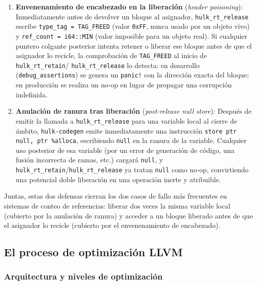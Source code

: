 \documentclass[12pt, a4paper]{article}
\begin{document}
\begin{enumerate}[leftmargin=*, label=\arabic*.]
  \item \textbf{Envenenamiento de encabezado en la liberación} (\textit{header
        poisoning}): Inmediatamente antes de devolver un bloque al asignador,
        \texttt{hulk\_rt\_release} escribe \texttt{type\_tag = TAG\_FREED}
        (valor \texttt{0xFF}, nunca usado por un objeto vivo) y
        \texttt{ref\_count = i64::MIN} (valor imposible para un objeto real). Si
        cualquier puntero colgante posterior intenta retener o liberar ese bloque
        antes de que el asignador lo recicle, la comprobación de
        \texttt{TAG\_FREED} al inicio de \texttt{hulk\_rt\_retain}/
        \texttt{hulk\_rt\_release} lo detecta: en desarrollo (\texttt{debug\_assertions})
        se genera un \texttt{panic!} con la dirección exacta del bloque; en producción
        se realiza un no-op en lugar de propagar una corrupción indefinida.
  \item \textbf{Anulación de ranura tras liberación} (\textit{post-release null
        store}): Después de emitir la llamada a \texttt{hulk\_rt\_release} para
        una variable local al cierre de ámbito, \texttt{hulk-codegen} emite
        inmediatamente una instrucción \texttt{store ptr null, ptr \%alloca},
        escribiendo \texttt{null} en la ranura de la variable. Cualquier uso
        posterior de esa variable (por un error de generación de código, una
        fusión incorrecta de ramas, etc.) cargará \texttt{null}, y
        \texttt{hulk\_rt\_retain}/\texttt{hulk\_rt\_release} ya tratan \texttt{null}
        como no-op, convirtiendo una potencial doble liberación en una operación
        inerte y atribuible.
\end{enumerate}

Juntas, estas dos defensas cierran los dos casos de fallo más frecuentes en
sistemas de conteo de referencias: liberar dos veces la misma variable local
(cubierto por la anulación de ranura) y acceder a un bloque liberado antes de
que el asignador lo recicle (cubierto por el envenenamiento de encabezado).

\subsection{El proceso de optimización LLVM}
\label{sec:optimization}

\subsubsection{Arquitectura y niveles de optimización}
\end{document}
